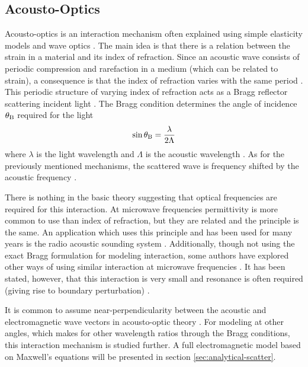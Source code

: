 \documentclass[11pt,twoside]{eitExjobb}
\begin{document}
	\subsection{Acousto-Optics}
	Acousto-optics is an interaction mechanism often explained using simple elasticity models and wave optics \cite{Saleh2007}\cite{Korpel1981}. The main idea is that there is a relation between the strain in a material and its index of refraction. Since an acoustic wave consists of periodic compression and rarefaction in a medium (which can be related to strain), a consequence is that the index of refraction varies with the same period \cite{Saleh2007}. This periodic structure of varying index of refraction acts as a Bragg reflector scattering incident light \cite{Saleh2007}. The Bragg condition determines the angle of incidence $\theta_{\mathrm{B}}$ required for the light
	\begin{equation*}
		\sin{\theta_{\mathrm{B}}} = \frac{\lambda}{2\Lambda}
	\end{equation*}
	where $\lambda$ is the light wavelength and $\Lambda$ is the acoustic wavelength \cite{Saleh2007}. As for the previously mentioned mechanisms, the scattered wave is frequency shifted by the acoustic frequency \cite{Korpel1988}.
	
	There is nothing in the basic theory suggesting that optical frequencies are required for this interaction. At microwave frequencies permittivity is more common to use than index of refraction, but they are related and the principle is the same. An application which uses this principle and has been used for many years is the radio acoustic sounding system \cite{Buerkle2007}. Additionally, though not using the exact Bragg formulation for modeling interaction, some authors have explored other ways of using similar interaction at microwave frequencies \cite{Lawrence2001}\cite{Merkel2006}. It has been stated, however, that this interaction is very small and resonance is often required (giving rise to boundary perturbation) \cite{Buerkle2007}.
	
	It is common to assume near-perpendicularity between the acoustic and electromagnetic wave vectors in acousto-optic theory \cite{Korpel1988}. For modeling at other angles, which makes for other wavelength ratios through the Bragg conditions, this interaction mechanism is studied further. A full electromagnetic model based on Maxwell's equations will be presented in section \ref{sec:analytical-scatter}.
	
\end{document}

